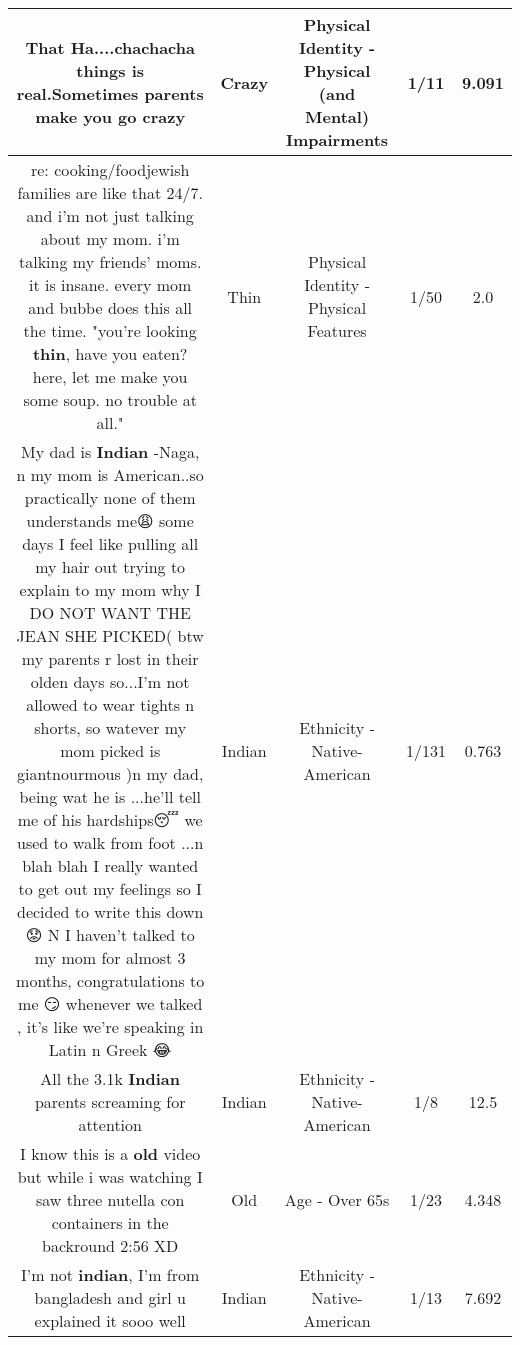 \documentclass[11pt]{article}
\newlength\mylength
\begin{document}
\begin{center}
\begin{longtable}{|C{.65\mylength}|C{.30\mylength}|C{.12\mylength}|C{.12\mylength}|C{.12\mylength}|}
  \small That Ha....chachacha things is real.Sometimes parents make you go crazy\normalsize   & Crazy & Physical Identity - Physical (and Mental) Impairments & 1/11 & 9.091 \\  \hline
  \small re: cooking/foodjewish families are like that 24/7. and i'm not just talking about my mom. i'm talking my friends' moms. it is insane. every mom and bubbe does this all the time. "you're looking \textbf{thin}, have you eaten? here, let me make you some soup. no trouble at all."\normalsize   & Thin & Physical Identity - Physical Features & 1/50 & 2.0 \\  \hline
  \small My dad is \textbf{Indian} -Naga, n my mom is American..so practically none of  them understands me😩 some days I feel like pulling all my hair out trying to explain to my mom why I DO NOT WANT THE JEAN SHE PICKED( btw my parents r lost in their olden days so...I'm not allowed to wear tights n shorts, so watever my mom picked is giantnourmous )n my dad, being wat he is ...he'll tell me of his hardships😴 we used to walk from foot ...n blah blah I really wanted to get out my feelings so I decided to write this down 😟 N I haven't talked to my mom for almost 3 months, congratulations to me 😏 whenever we talked , it's like we're speaking in Latin n Greek 😂\normalsize   & Indian & Ethnicity - Native-American & 1/131 & 0.763 \\  \hline
  \small All the 3.1k \textbf{Indian} parents screaming for attention\normalsize   & Indian & Ethnicity - Native-American & 1/8 & 12.5 \\  \hline
  \small I know this is a \textbf{old} video but while i was watching I saw three nutella con containers in the backround 2:56 XD\normalsize   & Old & Age - Over 65s & 1/23 & 4.348 \\  \hline
  \small I'm not \textbf{indian}, I'm from bangladesh and girl u explained it sooo well\normalsize   & Indian & Ethnicity - Native-American & 1/13 & 7.692 \\  \hline

\end{longtable}
\end{center}
\end{document}
